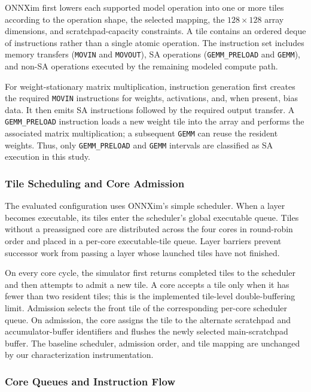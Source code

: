 ONNXim first lowers each supported model operation into one or more tiles
according to the operation shape, the selected mapping, the $128\times128$
array dimensions, and scratchpad-capacity constraints. A tile contains an
ordered deque of instructions rather than a single atomic operation. The
instruction set includes memory transfers (\texttt{MOVIN} and
\texttt{MOVOUT}), SA operations (\texttt{GEMM\_PRELOAD} and
\texttt{GEMM}), and non-SA operations executed by the remaining modeled
compute path.

For weight-stationary matrix multiplication, instruction generation first
creates the required \texttt{MOVIN} instructions for weights, activations,
and, when present, bias data. It then emits SA instructions followed by the
required output transfer. A \texttt{GEMM\_PRELOAD} instruction loads a new
weight tile into the array and performs the associated matrix multiplication;
a subsequent \texttt{GEMM} can reuse the resident weights. Thus, only
\texttt{GEMM\_PRELOAD} and \texttt{GEMM} intervals are classified as SA
execution in this study.

\subsubsection{Tile Scheduling and Core Admission}

The evaluated configuration uses ONNXim's simple scheduler. When a layer
becomes executable, its tiles enter the scheduler's global executable queue.
Tiles without a preassigned core are distributed across the four cores in
round-robin order and placed in a per-core executable-tile queue. Layer
barriers prevent successor work from passing a layer whose launched tiles
have not finished.

On every core cycle, the simulator first returns completed tiles to the
scheduler and then attempts to admit a new tile. A core accepts a tile only
when it has fewer than two resident tiles; this is the implemented tile-level
double-buffering limit. Admission selects the front tile of the corresponding
per-core scheduler queue. On admission, the core assigns the tile to the
alternate scratchpad and accumulator-buffer identifiers and flushes the newly
selected main-scratchpad buffer. The baseline scheduler, admission order, and
tile mapping are unchanged by our characterization instrumentation.

\subsubsection{Core Queues and Instruction Flow}

